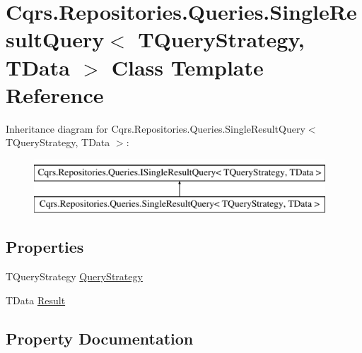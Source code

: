 \hypertarget{classCqrs_1_1Repositories_1_1Queries_1_1SingleResultQuery}{}\section{Cqrs.\+Repositories.\+Queries.\+Single\+Result\+Query$<$ T\+Query\+Strategy, T\+Data $>$ Class Template Reference}
\label{classCqrs_1_1Repositories_1_1Queries_1_1SingleResultQuery}
Inheritance diagram for Cqrs.\+Repositories.\+Queries.\+Single\+Result\+Query$<$ T\+Query\+Strategy, T\+Data $>$\+:\begin{figure}[H]
\begin{center}
\leavevmode
\includegraphics[height=2.000000cm]{classCqrs_1_1Repositories_1_1Queries_1_1SingleResultQuery}
\end{center}
\end{figure}
\subsection*{Properties}
\begin{DoxyCompactItemize}
\item 
T\+Query\+Strategy \hyperlink{classCqrs_1_1Repositories_1_1Queries_1_1SingleResultQuery_aed8abf985add794371490fc8e66ed628_aed8abf985add794371490fc8e66ed628}{Query\+Strategy}
\item 
T\+Data \hyperlink{classCqrs_1_1Repositories_1_1Queries_1_1SingleResultQuery_a8ec51fe4bb5f1c9f1f62abdf9cf7c370_a8ec51fe4bb5f1c9f1f62abdf9cf7c370}{Result}
\end{DoxyCompactItemize}


\subsection{Property Documentation}
\mbox{\label{classCqrs_1_1Repositories_1_1Queries_1_1SingleResultQuery_aed8abf985add794371490fc8e66ed628_aed8abf985add794371490fc8e66ed628}} 
